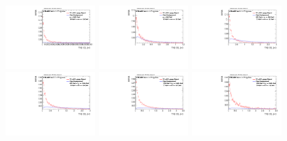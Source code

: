 \begin{figure}[H]
\includegraphics[width=0.3\textwidth]{sascha_input/Appendix/Distributions/w/distributions/beta3/h_assisted_tj_C2_3_bin6.pdf} 
\bigskip
\includegraphics[width=0.3\textwidth]{sascha_input/Appendix/Distributions/w/distributions/beta3/h_assisted_tj_D2_3_bin1.pdf} \hspace{1mm}
\includegraphics[width=0.3\textwidth]{sascha_input/Appendix/Distributions/w/distributions/beta3/h_assisted_tj_D2_3_bin2.pdf} \hspace{1mm}
\includegraphics[width=0.3\textwidth]{sascha_input/Appendix/Distributions/w/distributions/beta3/h_assisted_tj_D2_3_bin3.pdf} 
\bigskip
\includegraphics[width=0.3\textwidth]{sascha_input/Appendix/Distributions/w/distributions/beta3/h_assisted_tj_D2_3_bin4.pdf} \hspace{1mm}
\includegraphics[width=0.3\textwidth]{sascha_input/Appendix/Distributions/w/distributions/beta3/h_assisted_tj_D2_3_bin5.pdf} \hspace{1mm}

\end{figure}
